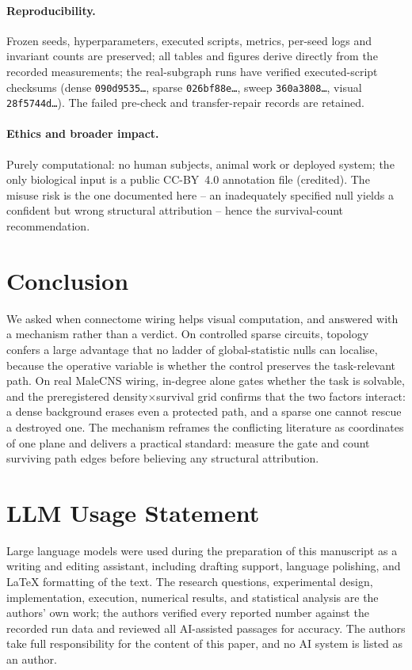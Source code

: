 \documentclass[10pt,twocolumn,letterpaper]{article}
\begin{document}
\paragraph{Reproducibility.}
Frozen seeds, hyperparameters, executed scripts, metrics, per-seed logs and
invariant counts are preserved; all tables and figures derive directly from
the recorded measurements; the real-subgraph runs have verified
executed-script checksums (dense \texttt{090d9535\ldots}, sparse
\texttt{026bf88e\ldots}, sweep \texttt{360a3808\ldots}, visual \texttt{28f5744d\ldots}). The
failed pre-check and transfer-repair records are retained.

\paragraph{Ethics and broader impact.}
Purely computational: no human subjects, animal work or deployed system; the
only biological input is a public CC-BY~4.0 annotation file (credited). The
misuse risk is the one documented here -- an inadequately specified null
yields a confident but wrong structural attribution -- hence the survival-count
recommendation.

\section{Conclusion}
\label{sec:conclusion}

We asked when connectome wiring helps visual computation, and answered with a
mechanism rather than a verdict. On controlled sparse circuits, topology
confers a large advantage that no ladder of global-statistic nulls can
localise, because the operative variable is whether the control preserves the
task-relevant path. On real MaleCNS wiring, in-degree alone gates whether the
task is solvable, and the preregistered density$\times$survival grid confirms
that the two factors interact: a dense background erases even a protected
path, and a sparse one cannot rescue a destroyed one. The mechanism reframes
the conflicting literature as coordinates of one plane and delivers a
practical standard: measure the gate and count surviving path edges before
believing any structural attribution.

\clearpage

\section*{LLM Usage Statement}
Large language models were used during the preparation of this manuscript as
a writing and editing assistant, including drafting support, language
polishing, and \LaTeX{} formatting of the text. The research questions,
experimental design, implementation, execution, numerical results, and
statistical analysis are the authors' own work; the authors verified every
reported number against the recorded run data and reviewed all AI-assisted
passages for accuracy. The authors take full responsibility for the content
of this paper, and no AI system is listed as an author.

{
\small


}
\end{document}
